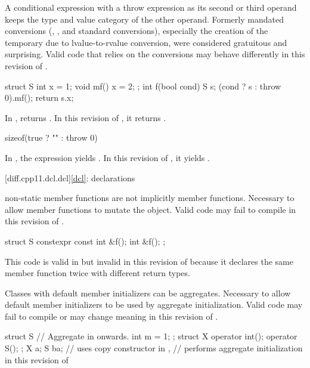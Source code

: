 \change
A conditional expression with a throw expression as its second or third
operand keeps the type and value category of the other operand.
\rationale
Formerly mandated conversions (,
, and 
standard conversions), especially the creation of the temporary due to
lvalue-to-rvalue conversion, were considered gratuitous and surprising.
\effect
Valid \CppXI{} code that relies on the conversions may behave differently
in this revision of \Cpp{}.
\begin{example}
\begin{codeblock}
struct S {
  int x = 1;
  void mf() { x = 2; }
};
int f(bool cond) {
  S s;
  (cond ? s : throw 0).mf();
  return s.x;
}
\end{codeblock}
In \CppXI{},  returns . In this revision of \Cpp{},
it returns .
\begin{codeblock}
sizeof(true ? "" : throw 0)
\end{codeblock}
In \CppXI{}, the expression yields . In this
revision of \Cpp{}, it yields .
\end{example}

[diff.cpp11.dcl.dcl]{\ref{dcl}: declarations}

\change
{} non-static member functions are not implicitly
 member functions.
\rationale
Necessary to allow  member functions to mutate
the object.
\effect
Valid \CppXI{} code may fail to compile in this revision of \Cpp{}.
\begin{example}
\begin{codeblock}
struct S {
  constexpr const int &f();
  int &f();
};
\end{codeblock}
This code is valid in \CppXI{}
but invalid in this revision of \Cpp{} because it declares the same member
function twice with different return types.
\end{example}

\change
Classes with default member initializers can be aggregates.
\rationale
Necessary to allow default member initializers to be used
by aggregate initialization.
\effect
Valid \CppXI{} code may fail to compile or may change meaning in this revision of \Cpp{}.
\begin{example}
\begin{codeblock}
struct S {          // Aggregate in \CppXIV{} onwards.
  int m = 1;
};
struct X {
  operator int();
  operator S();
};
X a{};
S b{a};             // uses copy constructor in \CppXI{},
                    // performs aggregate initialization in this revision of \Cpp{}
\end{codeblock}
\end{example}

